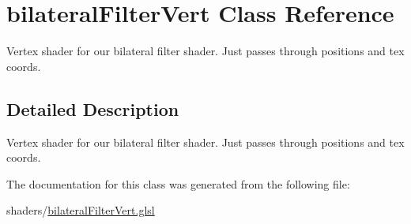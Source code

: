 \hypertarget{classbilateral_filter_vert}{\section{bilateral\-Filter\-Vert Class Reference}
\label{classbilateral_filter_vert}
}


Vertex shader for our bilateral filter shader. Just passes through positions and tex coords.  




\subsection{Detailed Description}
Vertex shader for our bilateral filter shader. Just passes through positions and tex coords. 

The documentation for this class was generated from the following file\-:\begin{DoxyCompactItemize}
\item 
shaders/\hyperlink{bilateral_filter_vert_8glsl}{bilateral\-Filter\-Vert.\-glsl}\end{DoxyCompactItemize}
